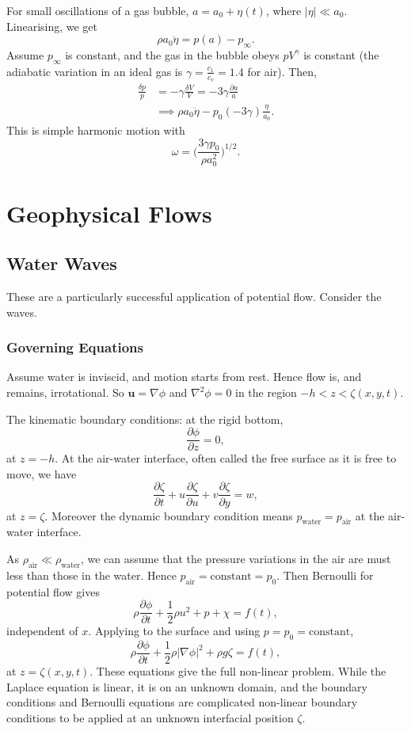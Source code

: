 \documentclass[12pt]{article}
\begin{document}
For small oscillations of a gas bubble, $a = a_0 + \eta(t)$, where $|\eta| \ll a_0$. Linearising, we get
\[
\rho a_0 \ddot \eta = p(a) - p_{\infty}.
\]
Assume $p_{\infty}$ is constant, and the gas in the bubble obeys $pV^{\gamma}$ is constant (the adiabatic variation in an ideal gas is $\gamma = \frac{c_1}{c_v} = 1.4$ for air). Then,
\begin{align*}
	\frac{\delta p}{p} &= - \gamma \frac{\delta V}{V} = - 3\gamma \frac{\partial a}{a} \\
			   &\implies \rho a_0 \ddot \eta - p_0(-3 \gamma) \frac{\eta}{a_0}.
\end{align*}
This is simple harmonic motion with
\[
\omega = \biggl(\frac{3 \gamma p_0}{\rho a_0^2}\biggr)^{1/2}.
\]

\newpage

\section{Geophysical Flows}
\label{sec:geophysical_flows}

\subsection{Water Waves}
\label{sub:water_waves}

These are a particularly successful application of potential flow. Consider the waves.

\subsubsection{Governing Equations}
\label{subsub:governing_equations}

Assume water is inviscid, and motion starts from rest. Hence flow is, and remains, irrotational. So $\mathbf{u} = \nabla \phi$ and $\nabla^2 \phi = 0$ in the region $-h < z < \zeta(x, y, t)$.

The kinematic boundary conditions: at the rigid bottom,
\[
\frac{\partial \phi}{\partial z} = 0,
\]
at $z = -h$. At the air-water interface, often called the free surface as it is free to move, we have
\[
\frac{\partial \zeta}{\partial t} + u \frac{\partial \zeta}{\partial u} + v \frac{\partial \zeta}{\partial y} = w,
\]
at $z = \zeta$. Moreover the dynamic boundary condition means $p_{\mathrm{water}} = p_{\mathrm{air}}$ at the air-water interface.

As $\rho_{\mathrm{air}} \ll \rho_{\mathrm{water}}$, we can assume that the pressure variations in the air are must less than those in the water. Hence $p_{\mathrm{air}} = \text{constant} = p_{0}$. Then Bernoulli for potential flow gives
\[
\rho \frac{\partial \phi}{\partial t} + \frac{1}{2} \rho u^2 + p + \chi = f(t),
\]
independent of $x$. Applying to the surface and using $p = p_0 = \text{constant}$,
\[
\rho \frac{\partial \phi}{\partial t} + \frac{1}{2} \rho |\nabla \phi|^2 + \rho g \zeta = f(t),
\]
at $z = \zeta(x, y, t)$. These equations give the full non-linear problem. While the Laplace equation is linear, it is on an unknown domain, and the boundary conditions and Bernoulli equations are complicated non-linear boundary conditions to be applied at an unknown interfacial position $\zeta$.
\end{document}

